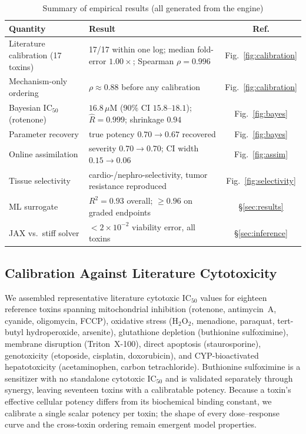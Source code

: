 \documentclass[journal]{IEEEtran}
\begin{document}
\begin{table}[!t]
\renewcommand{\arraystretch}{1.25}
\caption{Summary of empirical results (all generated from the engine)}
\label{tab:results}
\centering
\footnotesize
\begin{tabular}{@{}p{2.5cm}p{4.0cm}c@{}}
\toprule
Quantity & Result & Ref. \\
\midrule
Literature calibration (17 toxins) & 17/17 within one log; median fold-error $1.00\times$; Spearman $\rho=0.996$ & Fig.~\ref{fig:calibration} \\
Mechanism-only ordering & $\rho\approx0.88$ before any calibration & Fig.~\ref{fig:calibration} \\
Bayesian IC$_{50}$ (rotenone) & $16.8\,\mu$M (90\% CI $15.8$--$18.1$); $\hat R=0.999$; shrinkage $0.94$ & Fig.~\ref{fig:bayes} \\
Parameter recovery & true potency $0.70 \rightarrow 0.67$ recovered & Fig.~\ref{fig:bayes} \\
Online assimilation & severity $0.70\rightarrow0.70$; CI width $0.15\rightarrow0.06$ & Fig.~\ref{fig:assim} \\
Tissue selectivity & cardio-/nephro-selectivity, tumor resistance reproduced & Fig.~\ref{fig:selectivity} \\
ML surrogate & $R^2=0.93$ overall; $\ge0.96$ on graded endpoints & \S\ref{sec:results} \\
JAX vs.\ stiff solver & $<2\times10^{-2}$ viability error, all toxins & \S\ref{sec:inference} \\
\bottomrule
\end{tabular}
\end{table}

\subsection{Calibration Against Literature Cytotoxicity}

We assembled representative literature cytotoxic IC$_{50}$ values for eighteen
reference toxins spanning mitochondrial inhibition (rotenone, antimycin~A,
cyanide, oligomycin, FCCP), oxidative stress (H$_2$O$_2$, menadione, paraquat,
tert-butyl hydroperoxide, arsenite), glutathione depletion (buthionine
sulfoximine), membrane disruption (Triton~X-100), direct apoptosis
(staurosporine), genotoxicity (etoposide, cisplatin, doxorubicin), and
CYP-bioactivated hepatotoxicity (acetaminophen, carbon tetrachloride).
Buthionine sulfoximine is a sensitizer with no standalone cytotoxic IC$_{50}$ and
is validated separately through synergy, leaving seventeen toxins with a
calibratable potency. Because a
toxin's effective cellular potency differs from its biochemical binding constant,
we calibrate a single scalar potency per toxin; the shape of every dose--response
curve and the cross-toxin ordering remain emergent model properties.
\end{document}
